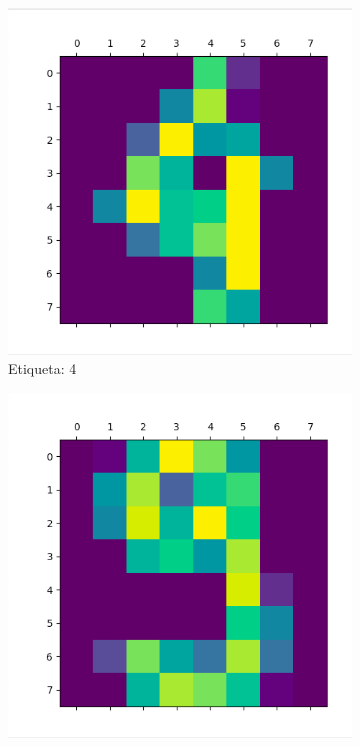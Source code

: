 \documentclass{article}
\begin{document}
\begin{figure}[H]
	\begin{subfigure}[b]{0.3\textwidth}
		\centering
		\includegraphics*[scale=0.2]{muestra4.png}
		\caption{Etiqueta: 4}
	\end{subfigure}
	\begin{subfigure}[b]{0.3\textwidth}
		\centering
		\includegraphics*[scale=0.2]{muestra9.png}

\end{subfigure}
\end{figure}
\end{document}
